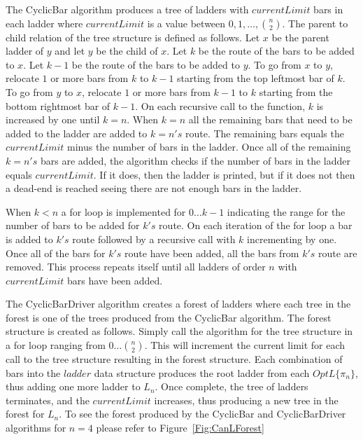 The {\sc CyclicBar} algorithm produces a tree of ladders with $currentLimit$ bars in each ladder where $currentLimit$
is a value between $0,1, \dots, {n \choose 2}$. The parent to child relation of the tree structure 
is defined as follows. Let $x$ be the parent ladder of $y$ and let $y$ be the 
child of $x$. Let $k$ be the route of the bars to be added to $x$. Let $k-1$ be 
the route of the bars to be added to $y$. To go from $x$  
to $y$, relocate $1$ or more bars from $k$ to $k-1$ starting from 
the top leftmost bar of $k$. To go from $y$ to $x$, 
relocate $1$ or more bars from $k-1$ to $k$ starting 
from the bottom rightmost bar of $k-1$. 
On each recursive call to the function, $k$ is increased by one until $k=n$. When $k=n$ all the remaining bars that need to 
be added to the ladder are added to $k=n's$ route. The remaining bars equals the $currentLimit$ minus the number of bars in the ladder.
Once all of the remaining $k=n's$ bars are added, the algorithm 
checks if the number of bars in the ladder equals $currentLimit$. If it does, then the ladder is printed, but if it 
does not then a dead-end is reached seeing there are not enough bars in the ladder.\par 
When $k < n$ a for loop is implemented for $0 \dots k-1$ indicating the range for the number of bars 
to be added for $k's$ route. On each iteration of the for loop a bar is added to $k's$ route followed by a 
recursive call with $k$ incrementing by one. Once all of the bars for $k's$ route have been added, all 
the bars from $k's$ route are removed. This process repeats itself until all ladders of order $n$ with 
$currentLimit$ bars have been added.\par  
The {\sc CyclicBarDriver} algorithm creates a forest of ladders where each tree in the forest is 
one of the trees produced from the {\sc CyclicBar} algorithm.
The forest structure is created as follows. Simply call the algorithm for the tree structure in a for loop 
ranging from $0 \dots {n \choose 2}$. This will increment the current limit for each call to the tree structure 
resulting in the forest structure.
Each combination of bars into the $ladder$ 
data structure produces the root ladder from each $OptL\{\pi_{n}\}$, thus adding one more ladder to $L_{n}$.
Once complete, the tree of ladders terminates, and the $currentLimit$ increases, thus producing a new tree in the forest for 
$L_{n}$. To see the forest produced by the {\sc CyclicBar} and {\sc CyclicBarDriver} algorithms for $n=4$ please refer to 
Figure~\ref{Fig:CanLForest}\pagebreak
